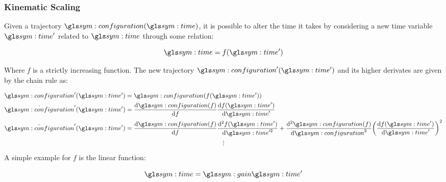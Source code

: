 		\subsubsection{Kinematic Scaling}%
		\label{sec:kinematic_scaling}

			Given a trajectory $\configuration(\timesym)$, it is possible to
			alter the time it takes by considering a new time variable
			$\timesym'$ related to $\timesym$ through some relation:

			\begin{equation}
				\timesym = f(\timesym')
				\label{eq:time_scaling}
			\end{equation}

			Where $f$ is a strictly increasing function. The new trajectory
			$\configuration'(\timesym')$ and its higher derivates are given by
			the chain rule as:

			\begin{align}
				\begin{split}
					\configuration'(\timesym') &= \configuration(f(\timesym'))\\
					\dot{\configuration}'(\timesym') &=
						\frac
						{%
							\der \configuration(f)
						}
						{%
							\der f
						}
						\frac
						{%
							\der f(\timesym')
						}
						{%
							\der \timesym'
						}\\
					\ddot{\configuration}'(\timesym') &=
						\frac
						{%
							\der \configuration(f)
						}
						{%
							\der f
						}
						\frac
						{%
							\der^2 f(\timesym')
						}
						{%
							\der \timesym'^2
						}
						+
						\frac
						{%
							\der^2 \configuration(f)
						}
						{%
							\der \configuration^2
						}
						{%
							\left(
								\frac
								{%
									\der f(\timesym')
								}
								{%
									\der \timesym'
								}
							\right)
						}^2\\
					\label{eq:kinematic_scaling_general}
				\end{split}
			\end{align}
			\[
				\vdots
			\]

			A simple example for $f$ is the linear function:

			\begin{equation}
				\timesym = \gain\timesym'
				\label{eq:linear_time_scaling}
			\end{equation}

